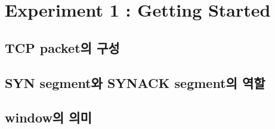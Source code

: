 \section{Experiment 1 : Getting Started}

\subsection{TCP packet의 구성}

\subsection{SYN segment와 SYNACK segment의 역할}

\subsection{window의 의미}